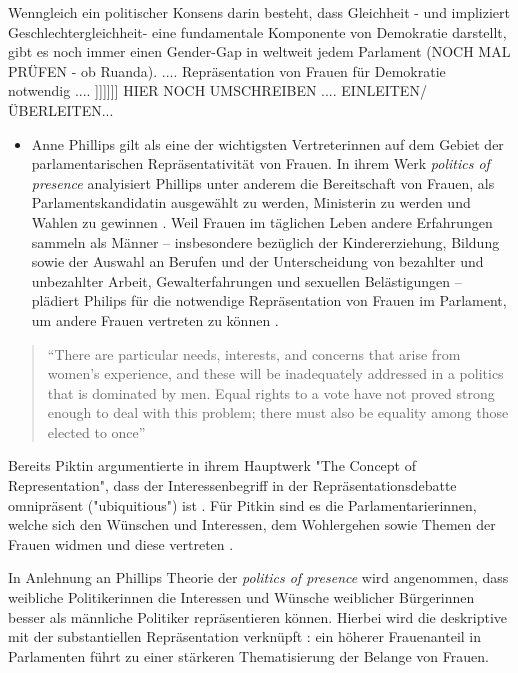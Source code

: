 \documentclass[12pt, 
    twoside=false, 
    bibliography=totoc, 
    numbers=endperiod, 
    headings=normal, 
    toc=chapterentrydotfill
    ]{scrbook}
\begin{document}
Wenngleich ein politischer Konsens darin besteht, dass Gleichheit - und impliziert Geschlechtergleichheit- eine fundamentale Komponente von Demokratie darstellt, gibt es noch immer einen Gender-Gap in weltweit jedem Parlament (NOCH MAL PRÜFEN - ob Ruanda).  .... Repräsentation von Frauen für Demokratie notwendig .... 
]]]]]]
HIER NOCH UMSCHREIBEN .... EINLEITEN/ÜBERLEITEN... 

\begin{itemize}
\item Anne Phillips gilt als eine der wichtigsten Vertreterinnen auf dem Gebiet der parlamentarischen Repräsentativität von Frauen. In ihrem Werk \emph{politics of presence} \parencite*{phillips_1998} analyisiert Phillips unter anderem die Bereitschaft von Frauen, als Parlamentskandidatin ausgewählt zu werden, Ministerin zu werden und Wahlen zu gewinnen \parencite[vgl.][416f.]{blaxill_2016}. 
Weil Frauen im täglichen Leben andere Erfahrungen sammeln als Männer -- insbesondere bezüglich der Kindererziehung, Bildung sowie der Auswahl an Berufen und der Unterscheidung von bezahlter und unbezahlter Arbeit, Gewalterfahrungen und sexuellen Belästigungen -- plädiert Philips für die notwendige Repräsentation von Frauen im Parlament, um andere Frauen vertreten zu können \parencite[vgl.][52]{wangnerud_2009}.
\end{itemize}

\begin{quote}
    \enquote{There are particular needs, interests, and concerns that arise from women's experience, and these will be inadequately addressed in a politics that is dominated by men. Equal rights to a vote have not proved strong enough to deal with this problem; there must also be equality among those elected to once} \parencite[66]{phillips_1998}
\end{quote}

Bereits Piktin \parencite*{pitkin_1972} argumentierte in ihrem Hauptwerk "The Concept of Representation", dass der Interessenbegriff in der Repräsentationsdebatte omnipräsent ("ubiquitious") ist \parencite[69]{wangnerud_2000}. Für Pitkin sind es die Parlamentarierinnen, welche sich den Wünschen und Interessen, dem Wohlergehen sowie Themen der Frauen widmen und diese vertreten \parencites[vgl.][413]{blaxill_2016}{pitkin_1972}. 

In Anlehnung an Phillips Theorie der \emph{politics of presence} \parencite*{phillips_1998} wird angenommen, dass weibliche Politikerinnen die Interessen und Wünsche weiblicher Bürgerinnen besser als männliche Politiker repräsentieren können. Hierbei wird die deskriptive mit der substantiellen Repräsentation verknüpft \parencite[52]{wangnerud_2009} : ein höherer Frauenanteil in Parlamenten führt zu einer stärkeren Thematisierung der Belange von Frauen.
\end{document}
